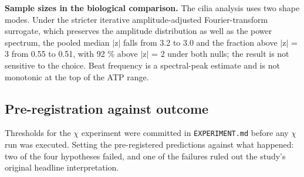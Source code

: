 \documentclass[aps,pre,preprint,superscriptaddress,nofootinbib,longbibliography]{revtex4-2}
\begin{document}
\textbf{Sample sizes in the biological comparison.} The cilia analysis uses two shape modes. Under the stricter iterative amplitude-adjusted Fourier-transform surrogate, which preserves the amplitude distribution as well as the power spectrum, the pooled median $|$z$|$ falls from 3.2 to 3.0 and the fraction above $|$z$|$ = 3 from 0.55 to 0.51, with 92 \% above $|$z$|$ = 2 under both nulls; the result is not sensitive to the choice. Beat frequency is a spectral-peak estimate and is not monotonic at the top of the ATP range.

\subsection{Pre-registration against outcome}

Thresholds for the $\chi$ experiment were committed in \texttt{EXPERIMENT.md} before any $\chi$ run was executed. Setting the pre-registered predictions against what happened: two of the four hypotheses failed, and one of the failures ruled out the study's original headline interpretation.
\end{document}
